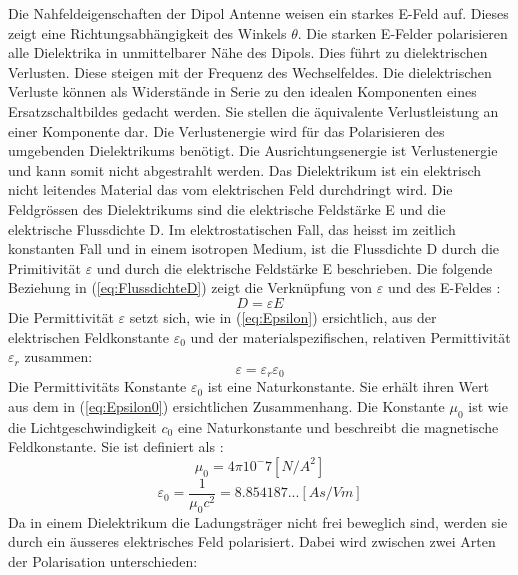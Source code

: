 Die Nahfeldeigenschaften der Dipol Antenne weisen ein starkes E-Feld auf. Dieses zeigt eine Richtungsabhängigkeit des Winkels $\theta$. Die starken E-Felder polarisieren alle Dielektrika in unmittelbarer Nähe des Dipols. Dies führt zu dielektrischen Verlusten. Diese steigen mit der Frequenz des Wechselfeldes. Die dielektrischen Verluste können als Widerstände in Serie zu den idealen Komponenten eines Ersatzschaltbildes gedacht werden. Sie stellen die äquivalente Verlustleistung an einer Komponente dar. Die Verlustenergie wird für das Polarisieren des umgebenden Dielektrikums benötigt. Die Ausrichtungsenergie ist Verlustenergie und kann somit nicht abgestrahlt werden.
Das Dielektrikum ist ein elektrisch nicht leitendes Material das vom elektrischen Feld durchdringt wird. Die Feldgrössen des Dielektrikums sind die elektrische Feldstärke E und die elektrische Flussdichte D. Im elektrostatischen Fall, das heisst im zeitlich konstanten Fall und in einem isotropen Medium, ist die Flussdichte D durch die Primitivität $\varepsilon $ und durch die elektrische Feldstärke E beschrieben. Die folgende Beziehung in (\ref{eq:FlussdichteD}) zeigt die Verknüpfung von $\varepsilon$  und des E-Feldes \cite{Emant}:
\begin{equation}\label{eq:FlussdichteD}
D=\varepsilon E
\end{equation}
Die Permittivität $\varepsilon$ setzt sich, wie in (\ref{eq:Epsilon}) ersichtlich, aus der elektrischen Feldkonstante $\varepsilon_0$ und der materialspezifischen, relativen Permittivität $\varepsilon_r$ zusammen:
\begin{equation}\label{eq:Epsilon}
\varepsilon = \varepsilon_r \varepsilon_0
\end{equation}
Die Permittivitäts Konstante $\varepsilon_{0}$ ist eine Naturkonstante. Sie erhält ihren Wert aus dem in (\ref{eq:Epsilon0}) ersichtlichen Zusammenhang. Die Konstante $\mu_{0}$ ist wie die Lichtgeschwindigkeit $c_0$ eine Naturkonstante und beschreibt die magnetische Feldkonstante. Sie ist definiert als \cite {WikiPermitt}: 
\begin{equation}\label{mu_0}
\mu_{0}=4\pi10^-7 [N/A^{2}] 
\end{equation}
\begin{equation}\label{eq:Epsilon0}
\varepsilon_{0} = \dfrac{1}{\mu_{0}c^{2}}=8.854187...[As/Vm]
\end{equation}
Da in einem Dielektrikum die Ladungsträger nicht frei beweglich sind, werden sie durch ein äusseres elektrisches Feld polarisiert. Dabei wird zwischen zwei Arten der Polarisation unterschieden:
